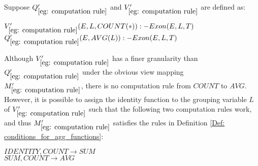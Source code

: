 \begin{example}\label{eg: computation rule}
Suppose $Q_{\ref{eg: computation rule}}'$ and $V_{\ref{eg: computation rule}}'$ are defined as:
\begin{tabbing}
$V_{\ref{eg: computation rule}}'(E, L, COUNT(*)) :- Exon(E, L, T)$\\
$Q_{\ref{eg: computation rule}}'(E, AVG(L)) :- Exon(E, L, T)$
\end{tabbing}

Although $V_{\ref{eg: computation rule}}'$ has a finer granularity than $Q_{\ref{eg: computation rule}}'$ under the obvious view mapping $M_{\ref{eg: computation rule}}'$, there is no computation rule from $COUNT$ to $AVG$. However, it is possible to assign the identity  function to the grouping variable $L$ of $V_{\ref{eg: computation rule}}'$ such that the following two computation rules work, and thus $M_{\ref{eg: computation rule}}'$ satisfies the rules in Definition \ref{Def: conditions_for_agg_functions}:

\begin{tabbing}
$IDENTITY, COUNT \rightarrow SUM$\\
$SUM, COUNT \rightarrow AVG$
\end{tabbing}

\end{example}




